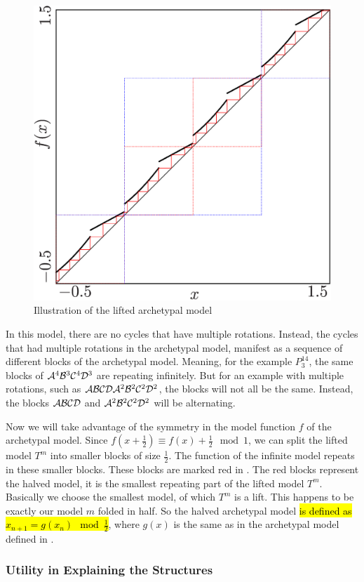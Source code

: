 \begin{figure}
	\centering
	\includegraphics[width=.7 \textwidth]{../Figures/7/7.18/result.png}
	\caption{Illustration of the lifted archetypal model}
	\label{fig:add.halved.lift}
\end{figure}

In this model, there are no cycles that have multiple rotations.
Instead, the cycles that had multiple rotations in the archetypal model, manifest as a sequence of different blocks of the archetypal model.
Meaning, for the example $P^{14}_3$, the same blocks of $\mathcal{A}^4\mathcal{B}^3\mathcal{C}^4\mathcal{D}^3$ are repeating infinitely.
But for an example with multiple rotations, such as $\mathcal{A}\mathcal{B}\mathcal{C}\mathcal{D}\mathcal{A}^2\mathcal{B}^2\mathcal{C}^2\mathcal{D}^2$, the blocks will not all be the same.
Instead, the blocks $\mathcal{A}\mathcal{B}\mathcal{C}\mathcal{D}$ and $\mathcal{A}^2\mathcal{B}^2\mathcal{C}^2\mathcal{D}^2$ will be alternating.

Now we will take advantage of the symmetry in the model function $f$ of the archetypal model.
Since $f\left(x + \frac{1}{2}\right) \equiv f(x) + \frac{1}{2} \mod 1$, we can split the lifted model $T^m$ into smaller blocks of size $\frac{1}{2}$.
The function of the infinite model repeats in these smaller blocks.
These blocks are marked red in .
The red blocks represent the halved model, it is the smallest repeating part of the lifted model $T^m$.
Basically we choose the smallest model, of which $T^m$ is a lift.
This happens to be exactly our model $m$ folded in half.
So the halved archetypal model \hl{is defined as $x_{n+1} = g(x_n) \mod \frac{1}{2}$}, where $g(x)$ is the same as in the archetypal model defined in .

\subsubsection{Utility in Explaining the  Structures}


